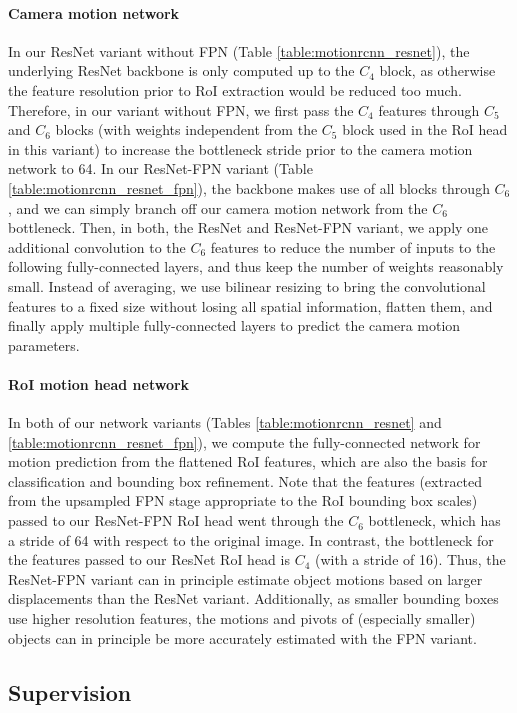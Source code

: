 \paragraph{Camera motion network}
In our ResNet variant without FPN (Table \ref{table:motionrcnn_resnet}), the underlying
ResNet backbone is only computed up to the $C_4$ block, as otherwise the
feature resolution prior to RoI extraction would be reduced too much.
Therefore, in our variant without FPN, we first pass the $C_4$ features through $C_5$
and $C_6$ blocks (with weights independent from the $C_5$ block used in the RoI head in this variant)
to increase the bottleneck stride prior to the camera motion network to 64.
In our ResNet-FPN variant (Table \ref{table:motionrcnn_resnet_fpn}),
the backbone makes use of all blocks through $C_6$, and
we can simply branch off our camera motion network from the $C_6$ bottleneck.
Then, in both, the ResNet and ResNet-FPN variant, we apply one additional
convolution to the $C_6$ features to reduce the number of inputs to the following
fully-connected layers, and thus keep the number of weights reasonably small.
Instead of averaging, we use bilinear resizing to bring the convolutional features
to a fixed size without losing all spatial information,
flatten them, and finally apply multiple fully-connected layers to predict the
camera motion parameters.

\paragraph{RoI motion head network}
In both of our network variants
(Tables \ref{table:motionrcnn_resnet} and \ref{table:motionrcnn_resnet_fpn}),
we compute the fully-connected network for motion prediction from the
flattened RoI features, which are also the basis for classification and
bounding box refinement.
Note that the features (extracted from the upsampled FPN stage appropriate to the RoI bounding box scales)
passed to our ResNet-FPN RoI head went through the $C_6$
bottleneck, which has a stride of 64 with respect to the original image.
In contrast, the bottleneck for the features passed to our ResNet RoI head
is $C_4$ (with a stride of 16). Thus, the ResNet-FPN variant can in principle estimate
object motions based on larger displacements than the ResNet variant.
Additionally, as smaller bounding boxes use higher resolution features, the
motions and pivots of (especially smaller) objects can in principle be more accurately
estimated with the FPN variant.

\subsection{Supervision}
\label{ssec:supervision}

